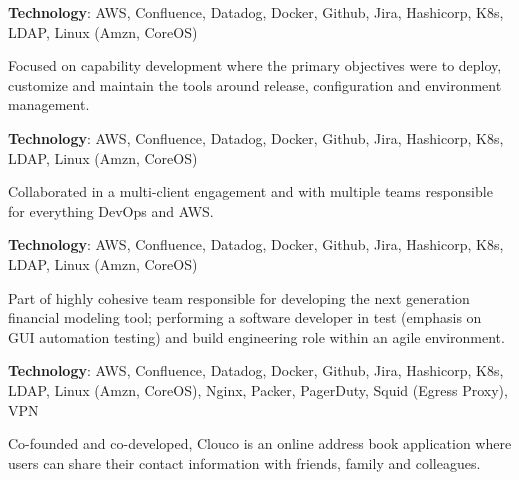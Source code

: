 \begin{minipage}[t]{1.0\textwidth}
\sectionsep
\textbf{Technology}: AWS, Confluence, Datadog, Docker, Github, Jira, Hashicorp, K8s, LDAP, Linux (Amzn, CoreOS)
\sectionsep
\begin{tightemize}
\item Focused on capability development where the primary objectives were to deploy, customize and maintain the tools around release, configuration and environment management.
\end{tightemize}
\sectionsep
\sectionsep
{}
\sectionsep
\textbf{Technology}: AWS, Confluence, Datadog, Docker, Github, Jira, Hashicorp, K8s, LDAP, Linux (Amzn, CoreOS)
\sectionsep
\begin{tightemize}
\item Collaborated in a multi-client engagement and with multiple teams responsible for everything DevOps and AWS\@.
\end{tightemize}
\sectionsep
\sectionsep
{}
\sectionsep
\textbf{Technology}: AWS, Confluence, Datadog, Docker, Github, Jira, Hashicorp, K8s, LDAP, Linux (Amzn, CoreOS)
\sectionsep
\begin{tightemize}
\item Part of highly cohesive team responsible for developing the next generation financial modeling tool; performing a software developer in test (emphasis on GUI automation testing) and build engineering role within an agile environment.
\end{tightemize}
\sectionsep
\sectionsep
{}
\sectionsep
\textbf{Technology}: AWS, Confluence, Datadog, Docker, Github, Jira, Hashicorp, K8s, LDAP, Linux (Amzn, CoreOS), Nginx, Packer, PagerDuty, Squid (Egress Proxy), VPN
\sectionsep
\begin{tightemize}
\item Co-founded and co-developed, Clouco is an online address book application where users can share their contact information with friends, family and colleagues.
\end{tightemize}
\sectionsep
\sectionsep
{}

\end{minipage}
